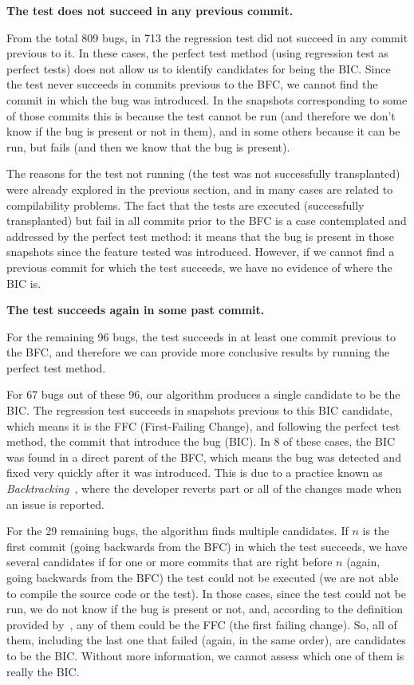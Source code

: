 \textbf{The test does not succeed in any previous commit.}

From the total 809 bugs, in 713 the regression test did not succeed in any commit previous to it. 
In these cases, the perfect test method (using regression test as perfect tests) does not allow us to identify candidates for being the BIC. 
Since the test never succeeds in commits previous to the BFC, we cannot find the commit in which the bug was introduced. 
In the snapshots corresponding to some of those commits this is because the test cannot be run (and therefore we don't know if the bug is present or not in them), and in some others because it can be run, but fails (and then we know that the bug is present).

The reasons for the test not running (the test was not successfully transplanted) were already explored in the previous section, and in many cases are related to compilability problems. 
The fact that the tests are executed (successfully transplanted) but fail in all commits prior to the BFC is a case contemplated and addressed by the perfect test method: it means that the bug is present in those snapshots since the feature tested was introduced.
However, if we cannot find a previous commit for which the test succeeds, we have no evidence of where the BIC is.

\textbf{The test succeeds again in some past commit.}

For the remaining 96 bugs, the test succeeds in at least one commit previous to the BFC, and therefore we can provide more conclusive results by running the perfect test method.

For 67 bugs out of these 96, our algorithm produces a single candidate to be the BIC. 
The regression test succeeds in snapshots previous to this BIC candidate, which means it is the FFC (First-Failing Change), and following the perfect test method, the commit that introduce the bug (BIC). 
In 8 of these cases, the BIC was found in a direct parent of the BFC, which means the bug was detected and fixed very quickly after it was introduced. 
This is due to a practice known as \textit{Backtracking}~\cite{yoon2012exploratory,yoon2014longitudinal}, where the developer reverts part or all of the changes made when an issue is reported.

For the 29 remaining bugs, the algorithm finds multiple candidates. 
If $n$ is the first commit (going backwards from the BFC) in which the test succeeds, we have several candidates if for one or more commits that are right before $n$ (again, going backwards from the BFC) the test could not be executed (we are not able to compile the source code or the test).
In those cases, since the test could not be run, we do not know if the bug is present or not, and, according to the definition provided by~\gema, any of them could be the FFC (the first failing change).
So, all of them, including the last one that failed (again, in the same order), are candidates to be the BIC. 
Without more information, we cannot assess which one of them is really the BIC.

